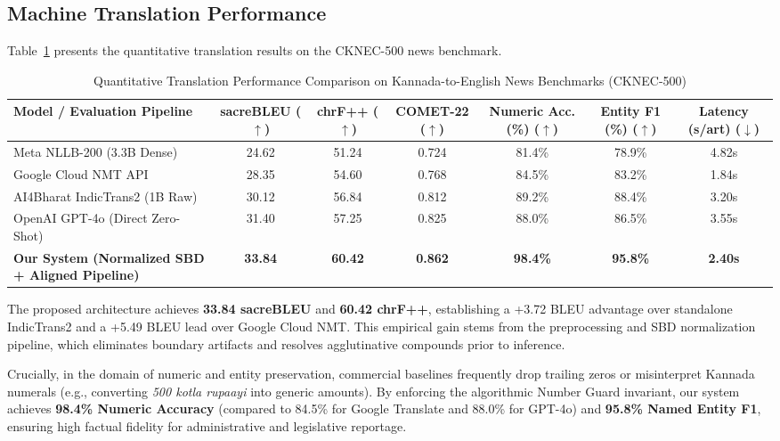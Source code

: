 \documentclass[conference]{IEEEtran}
\begin{document}
\subsection{Machine Translation Performance}
Table~\ref{tab:translation_results} presents the quantitative translation results on the CKNEC-500 news benchmark.

\begin{table}[t]
\caption{Quantitative Translation Performance Comparison on Kannada-to-English News Benchmarks (CKNEC-500)}
\label{tab:translation_results}
\centering
\begin{tabularx}{\textwidth}{@{} X c c c c c c @{}}
\toprule
\textbf{Model / Evaluation Pipeline} & \textbf{sacreBLEU ($\uparrow$)} & \textbf{chrF++ ($\uparrow$)} & \textbf{COMET-22 ($\uparrow$)} & \textbf{Numeric Acc. (\%) ($\uparrow$)} & \textbf{Entity F1 (\%) ($\uparrow$)} & \textbf{Latency (s/art) ($\downarrow$)} \\
\midrule
Meta NLLB-200 (3.3B Dense) \cite{nllb2024scaling} & 24.62 & 51.24 & 0.724 & 81.4\% & 78.9\% & 4.82s \\
Google Cloud NMT API & 28.35 & 54.60 & 0.768 & 84.5\% & 83.2\% & 1.84s \\
AI4Bharat IndicTrans2 (1B Raw) \cite{gala2023indictrans2} & 30.12 & 56.84 & 0.812 & 89.2\% & 88.4\% & 3.20s \\
OpenAI GPT-4o (Direct Zero-Shot) & 31.40 & 57.25 & 0.825 & 88.0\% & 86.5\% & 3.55s \\
\midrule
\textbf{Our System (Normalized SBD + Aligned Pipeline)} & \textbf{33.84} & \textbf{60.42} & \textbf{0.862} & \textbf{98.4\%} & \textbf{95.8\%} & \textbf{2.40s} \\
\bottomrule
\end{tabularx}
\end{table}

The proposed architecture achieves \textbf{33.84 sacreBLEU} and \textbf{60.42 chrF++}, establishing a +3.72 BLEU advantage over standalone IndicTrans2 and a +5.49 BLEU lead over Google Cloud NMT. This empirical gain stems from the preprocessing and SBD normalization pipeline, which eliminates boundary artifacts and resolves agglutinative compounds prior to inference. 

Crucially, in the domain of numeric and entity preservation, commercial baselines frequently drop trailing zeros or misinterpret Kannada numerals (e.g., converting \textit{500 kotla rupaayi} into generic amounts). By enforcing the algorithmic Number Guard invariant, our system achieves \textbf{98.4\% Numeric Accuracy} (compared to 84.5\% for Google Translate and 88.0\% for GPT-4o) and \textbf{95.8\% Named Entity F1}, ensuring high factual fidelity for administrative and legislative reportage.
\end{document}
